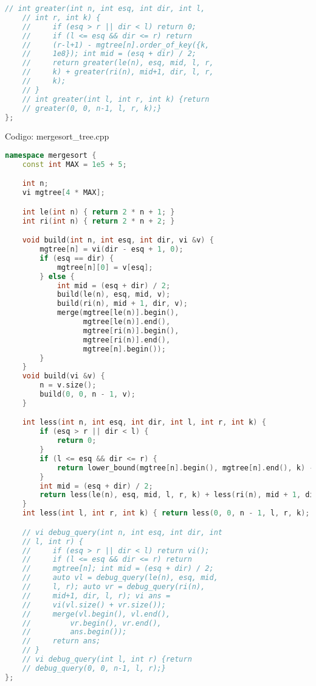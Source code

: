 \documentclass[10pt, a4paper, oneside]{book}
\begin{document}
\begin{lstlisting}[language=C++]
    // int greater(int n, int esq, int dir, int l,
    // int r, int k) {
    //     if (esq > r || dir < l) return 0;
    //     if (l <= esq && dir <= r) return
    //     (r-l+1) - mgtree[n].order_of_key({k,
    //     1e8}); int mid = (esq + dir) / 2;
    //     return greater(le(n), esq, mid, l, r,
    //     k) + greater(ri(n), mid+1, dir, l, r,
    //     k);
    // }
    // int greater(int l, int r, int k) {return
    // greater(0, 0, n-1, l, r, k);}
};
\end{lstlisting}
\hfill

Codigo: mergesort\_tree.cpp

\begin{lstlisting}[language=C++]
namespace mergesort {
    const int MAX = 1e5 + 5;

    int n;
    vi mgtree[4 * MAX];

    int le(int n) { return 2 * n + 1; }
    int ri(int n) { return 2 * n + 2; }

    void build(int n, int esq, int dir, vi &v) {
        mgtree[n] = vi(dir - esq + 1, 0);
        if (esq == dir) {
            mgtree[n][0] = v[esq];
        } else {
            int mid = (esq + dir) / 2;
            build(le(n), esq, mid, v);
            build(ri(n), mid + 1, dir, v);
            merge(mgtree[le(n)].begin(),
                  mgtree[le(n)].end(),
                  mgtree[ri(n)].begin(),
                  mgtree[ri(n)].end(),
                  mgtree[n].begin());
        }
    }
    void build(vi &v) {
        n = v.size();
        build(0, 0, n - 1, v);
    }

    int less(int n, int esq, int dir, int l, int r, int k) {
        if (esq > r || dir < l) {
            return 0;
        }
        if (l <= esq && dir <= r) {
            return lower_bound(mgtree[n].begin(), mgtree[n].end(), k) - mgtree[n].begin();
        }
        int mid = (esq + dir) / 2;
        return less(le(n), esq, mid, l, r, k) + less(ri(n), mid + 1, dir, l, r, k);
    }
    int less(int l, int r, int k) { return less(0, 0, n - 1, l, r, k); }

    // vi debug_query(int n, int esq, int dir, int
    // l, int r) {
    //     if (esq > r || dir < l) return vi();
    //     if (l <= esq && dir <= r) return
    //     mgtree[n]; int mid = (esq + dir) / 2;
    //     auto vl = debug_query(le(n), esq, mid,
    //     l, r); auto vr = debug_query(ri(n),
    //     mid+1, dir, l, r); vi ans =
    //     vi(vl.size() + vr.size());
    //     merge(vl.begin(), vl.end(),
    //         vr.begin(), vr.end(),
    //         ans.begin());
    //     return ans;
    // }
    // vi debug_query(int l, int r) {return
    // debug_query(0, 0, n-1, l, r);}
};
\end{lstlisting}
\hfill
\end{document}
